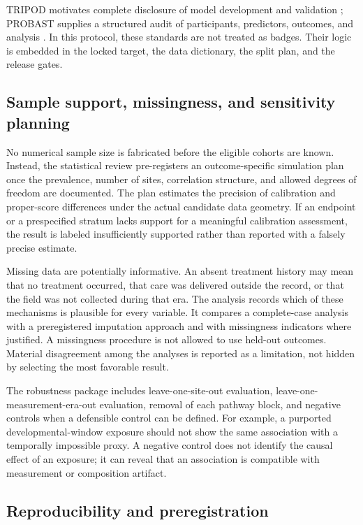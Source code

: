 \documentclass[conference]{IEEEtran}
\begin{document}
TRIPOD motivates complete disclosure of model development and validation
\cite{collins2015}; PROBAST supplies a structured audit of participants,
predictors, outcomes, and analysis \cite{wolff2019}. In this protocol,
these standards are not treated as badges. Their logic is embedded in the
locked target, the data dictionary, the split plan, and the release gates.

\subsection{Sample support, missingness, and sensitivity planning}

No numerical sample size is fabricated before the eligible cohorts are
known. Instead, the statistical review pre-registers an outcome-specific
simulation plan once the prevalence, number of sites, correlation structure,
and allowed degrees of freedom are documented. The plan estimates the
precision of calibration and proper-score differences under the actual
candidate data geometry. If an endpoint or a prespecified stratum lacks
support for a meaningful calibration assessment, the result is labeled
insufficiently supported rather than reported with a falsely precise
estimate.

Missing data are potentially informative. An absent treatment history may
mean that no treatment occurred, that care was delivered outside the record,
or that the field was not collected during that era. The analysis records
which of these mechanisms is plausible for every variable. It compares a
complete-case analysis with a preregistered imputation approach and with
missingness indicators where justified. A missingness procedure is not
allowed to use held-out outcomes. Material disagreement among the analyses is
reported as a limitation, not hidden by selecting the most favorable result.

The robustness package includes leave-one-site-out evaluation, leave-one-
measurement-era-out evaluation, removal of each pathway block, and negative
controls when a defensible control can be defined. For example, a purported
developmental-window exposure should not show the same association with a
temporally impossible proxy. A negative control does not identify the causal
effect of an exposure; it can reveal that an association is compatible with
measurement or composition artifact.

\subsection{Reproducibility and preregistration}
\end{document}
